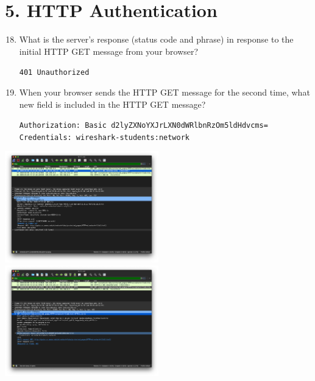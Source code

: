 \documentclass{article}
\begin{document}
\section*{5. HTTP Authentication}
\begin{enumerate}
\setcounter{enumi}{17}
\item What is the server’s response (status code and phrase) in response to the initial HTTP GET message from your browser?

\texttt{401 Unauthorized}

\item When your browser sends the HTTP GET message for the second time, what new field is included in the HTTP GET message?

\texttt{Authorization: Basic d2lyZXNoYXJrLXN0dWRlbnRzOm5ldHdvcms=}\\
\texttt{Credentials: wireshark-students:network}
\end{enumerate}
\includegraphics[width=0.5\textwidth]{lab2_part5_get1}
\includegraphics[width=0.5\textwidth]{lab2_part5_get2}
\end{document}
